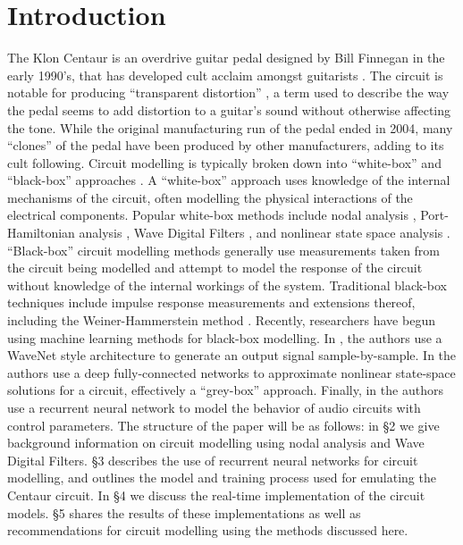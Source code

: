\documentclass[twoside,a4paper]{article}
\begin{document}
\section{Introduction}
The Klon Centaur is an overdrive guitar pedal designed by Bill
Finnegan in the early 1990's, that has developed cult acclaim
amongst guitarists \cite{Finnegan}. The circuit is notable for
producing ``transparent distortion'' \cite{electrosmash},
a term used to describe the way the pedal seems to add distortion
to a guitar's sound without otherwise affecting the tone. While
the original manufacturing run of the pedal ended in 2004, many
``clones'' of the pedal have been produced by other manufacturers,
adding to its cult following.
\newline\newline
Circuit modelling is typically broken down into ``white-box'' and
``black-box'' approaches \cite{Germain}. A ``white-box'' approach
uses knowledge of the internal mechanisms of the circuit, often
modelling the physical interactions of the electrical components.
Popular white-box methods include nodal analysis \cite{Yeh},
Port-Hamiltonian analysis \cite{PortHamiltonian}, Wave Digital
Filters \cite{Fettweis,KurtThesis}, and nonlinear state space
analysis \cite{StateSpace}.
\newline\newline
``Black-box'' circuit modelling methods generally use measurements
taken from the circuit being modelled and attempt to model the
response of the circuit without knowledge of the internal workings
of the system. Traditional black-box techniques include impulse
response measurements \cite{sasp} and extensions thereof, including
the Weiner-Hammerstein method \cite{Germain}. Recently, researchers
have begun using machine learning methods for black-box modelling.
In \cite{WaveNetVA}, the authors use a WaveNet style architecture
to generate an output signal sample-by-sample. In \cite{NLML} the
authors use a deep fully-connected networks to approximate nonlinear
state-space solutions for a circuit, effectively a ``grey-box'' approach.
Finally, in \cite{VArnn} the authors use a recurrent neural network
to model the behavior of audio circuits with control parameters.
\newline\newline
The structure of the paper will be as follows: in \S2 we give
background information on circuit modelling using nodal analysis
and Wave Digital Filters. \S3 describes the use of recurrent neural
networks for circuit modelling, and outlines the model and training
process used for emulating the Centaur circuit. In \S4 we discuss
the real-time implementation of the circuit models. \S5 shares
the results of these implementations as well as recommendations
for circuit modelling using the methods discussed here.
\end{document}
